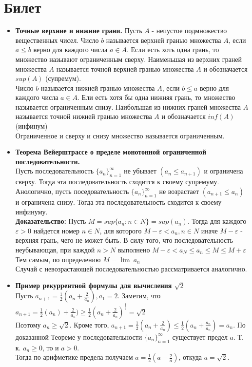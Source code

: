 \documentclass[12pt,a4paper]{article}
\begin{document}
\section{Билет}
\begin{itemize}
	\item \textbf{Точные верхние и нижние грани.}
	Пусть $A$ - непустое подмножество вещественных чисел.
	Число $b$ называется верхней гранью множества $A$, если $a \leq b$ верно для каждого числа $a \in A$. Если есть хоть одна грань, то множество называют ограниченным сверху. Наименьшая из верхних граней множества $A$ называется точной верхней гранью множества $A$ и обозначается $sup(A)$ (супремум).\\
	Число $b$ называется нижней гранью множества $A$, если $b \leq a$ верно для каждого числа $a \in A$. Ели есть хотя бы одна нижняя грань, то множество называется ограниченным снизу. Наибольшая из нижних граней множества $A$ называется точной нижней гранью множества  $A$ и обозначается $inf(A)$ (инфинум)\\
	Ограниченное и сверху и снизу множество называется ограниченным.
	\item \textbf{Теорема Вейерштрассе о пределе монотонной ограниченной последовательности.} \\
	Пусть последовательность $\{a_n\}_{n=1}^{\infty}$ не убывает $(a_n \leq a_{n + 1})$ и ограничена сверху. Тогда эта последовательность сходится к своему супремуму.\\
	Анологично, пусть поседовательность $\{a_n\}_{n=1}^{\infty}$ не возрастает $(a_{n + 1} \leq a_n)$ и ограничена снизу. Тогда эта последовательность сходится к своему инфинуму.\\
	\textbf{Доказательство:} Пусть $M = sup\{a_n : n \in N\} = sup(a_n)$. Тогда для каждого $\varepsilon > 0$ найдется номер $n \in N$, для которого $M - \varepsilon < a_n, n \in N$ иначе $M - \varepsilon$ - верхняя грань, чего не может быть. В силу того, что последовательность неубывающая, при каждой $n > N$ выполнено $M - \varepsilon < a_N \leq a_n \leq M \leq M + \varepsilon $\\
	Тем самым, по определению $M = \lim\ a_n$\\
	Случай с невозрастающей последовательностью рассматривается аналогично.\\
	\item \textbf{Пример рекуррентной формулы для вычисления $\sqrt2$\\}
	Пусть $a_{n + 1} = \frac{1}{2} (a_n + \frac{2}{a_n}), a_1 = 2$. Заметим, что $a_{n + 1} = \frac{1}{2} (a_n) + \frac{2}{a_n}) \geq \frac{1}{2} (a_n + \frac{2}{a_n})^{\frac{1}{2}} = \sqrt2$\\
	Поэтому $a_n \geq \sqrt2$. Кроме того, $a_{n + 1} = \frac{1}{2} (a_n + \frac{2}{a_n}) \leq \frac{1}{2} (a_n + \frac{a_n}{a_n}) = a_n$. По доказанной Теореме у последовательности $\{a_n\}_{n=1}^{\infty}$ существует предел $a$. Т. к. $a_n \geq 0$, то и $a > 0$.\\
	Тогда по арифметике предела получаем $a = \frac{1}{2} (a + \frac{2}{a})$, откуда $a = \sqrt2$.

\end{itemize}
\end{document}
